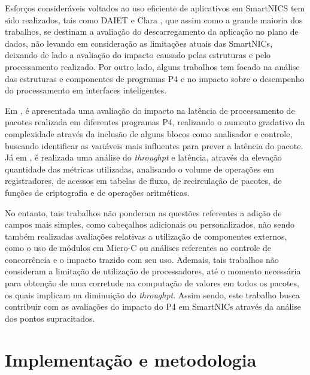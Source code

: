 \documentclass[12pt]{article}
\def\thr{\textit{throughpt}\xspace}
\begin{document}
Esforços consideráveis voltados ao uso eficiente de aplicativos em SmartNICS tem sido realizados, tais como DAIET \cite{daiet_17} e Clara \cite{clara_20}, que assim como a grande maioria dos trabalhos, se destinam a avaliação do descarregamento da aplicação no plano de dados, não levando em consideração as limitações atuais das SmartNICs, deixando de lado a avaliação do impacto causado pelas estruturas e pelo processamento realizado. Por outro lado, alguns trabalhos tem focado na análise das estruturas e componentes de programas P4 e no impacto sobre o desempenho do processamento em interfaces inteligentes. 

Em \cite{harkous_19}, é apresentada uma avaliação do impacto na latência de processamento de pacotes realizada em diferentes programas P4, realizando o aumento gradativo da complexidade através da inclusão de alguns blocos como analisador e controle, buscando identificar as variáveis mais influentes para prever a latência do pacote. Já em \cite{pablo_21}, é realizada uma análise do \thr e latência, através da elevação quantidade das métricas utilizadas, analisando o volume de operações em registradores, de acessos em tabelas de fluxo, de recirculação de pacotes, de funções de criptografia e de operações aritméticas.

No entanto, tais trabalhos não ponderam as questões referentes a adição de campos mais simples, como cabeçalhos adicionais ou personalizados, não sendo também realizadas avaliações relativas a utilização de componentes externos, como o uso de módulos em Micro-C ou análises referentes ao controle de concorrência e o impacto trazido com seu uso. Ademais, tais trabalhos não consideram a limitação de utilização de processadores, até o momento necessária para obtenção de uma corretude na computação de valores em todos os pacotes, os quais implicam na diminuição do \thr. Assim sendo, este trabalho busca contribuir com as avaliações do impacto do P4 em SmartNICs através da análise dos pontos supracitados.

\section{Implementação e metodologia} \label{sec:implementacao}
\end{document}
